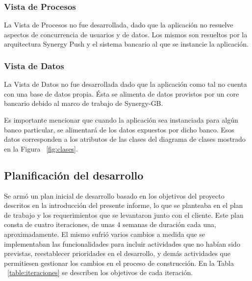 \subsubsection{Vista de Procesos}
La Vista de Procesos no fue desarrollada, dado que la aplicación no resuelve aspectos de concurrencia de usuarios y de datos. Los mismos son resueltos por la arquitectura Synergy Push y el sistema bancario al que se instancie la aplicación.


\subsubsection{Vista de Datos}
La Vista de Datos no fue desarrollada dado que la aplicación como tal no cuenta con una base de datos propia. Ésta se alimenta de datos provistos por un core bancario debido al marco de trabajo de Synergy-GB. 


Es importante mencionar que cuando la aplicación sea instanciada para algún banco particular, se alimentará de los datos expuestos por dicho banco. Esos datos corresponden a los atributos de las clases del diagrama de clases mostrado en la Figura  ~\ref{fig:clases}.


\subsection{Planificación del desarrollo}
Se armó un plan inicial de desarrollo basado en los objetivos del proyecto descritos en la introducción del presente informe, lo que se planteaba en el plan de trabajo y los requerimientos que se levantaron junto con el cliente.
Este plan consta de cuatro iteraciones, de unas 4 semanas de duración cada una, aproximadamente. El mismo sufrió varios cambios a medida que se implementaban las funcionalidades para incluir actividades que no habían sido previstas, reestablecer prioridades en el desarrollo, y demás actividades que permitiesen gestionar los cambios en el proceso de construcción. En la Tabla ~\ref{table:iteraciones} se describen los objetivos de cada iteración.


